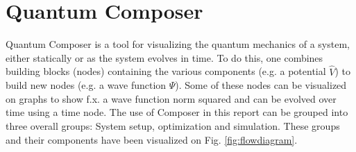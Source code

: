 \documentclass[a4paper, twocolumn]{revtex4-1}
\begin{document}
\section{Quantum Composer}\label{sec:Composer}
Quantum Composer is a tool for visualizing the quantum mechanics of a system, either statically or as the system evolves in time. To do this, one combines building blocks (nodes) containing the various components (e.g. a potential $\hat{V}$) to build new nodes (e.g. a wave function $\Psi$). Some of these nodes can be visualized on graphs to show f.x. a wave function norm squared and can be evolved over time using a time node. The use of Composer in this report can be grouped into three overall groups: System setup,  optimization and simulation. These groups and their components have been visualized on Fig. \ref{fig:flowdiagram}. 
\end{document}
